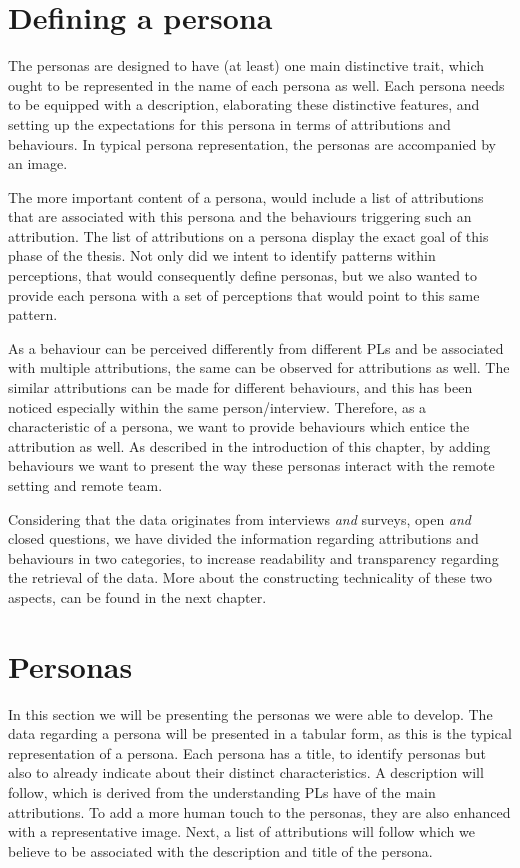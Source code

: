 \section{Defining a persona} \label{DefiningAPersona}

The personas are designed to have (at least) one main distinctive trait, which ought to be represented in the name of each persona as well. Each persona needs to be equipped with a description, elaborating these distinctive features, and setting up the expectations for this persona in terms of attributions and behaviours. In typical persona representation, the personas are accompanied by an image.

The more important content of a persona, would include a list of attributions that are associated with this persona and the behaviours triggering such an attribution. The list of attributions on a persona display the exact goal of this phase of the thesis. Not only did we intent to identify patterns within perceptions, that would consequently define personas, but we also wanted to provide each persona with a set of perceptions that would point to this same pattern.

As a behaviour can be perceived differently from different PLs and be associated with multiple attributions, the same can be observed for attributions as well. The similar attributions can be made for different behaviours, and this has been noticed especially within the same person/interview. Therefore, as a characteristic of a persona, we want to provide behaviours which entice the attribution as well. As described in the introduction of this chapter, by adding behaviours we want to present the way these personas interact with the remote setting and remote team.

Considering that the data originates from interviews \textit{and} surveys, open \textit{and} closed questions, we have divided the information regarding attributions and behaviours in two categories, to increase readability and transparency regarding the retrieval of the data. More about the constructing technicality of these two aspects, can be found in the next chapter.


\section{Personas} \label{Personas}

In this section we will be presenting the personas we were able to develop. The data regarding a persona will be presented in a tabular form, as this is the typical representation of a persona. Each persona has a title, to identify personas but also to already indicate about their distinct characteristics. A description will follow, which is derived from the understanding PLs have of the main attributions. To add a more human touch to the personas, they are also enhanced with a representative image. Next, a list of attributions will follow which we believe to be associated with the description and title of the persona. 

